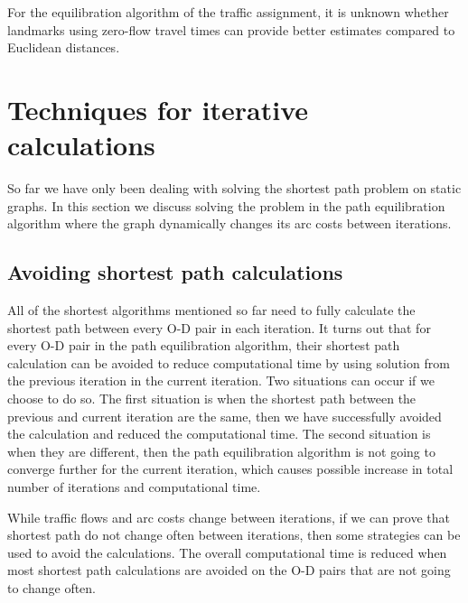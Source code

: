 For the equilibration algorithm of the traffic assignment,
it is unknown whether landmarks using zero-flow travel times can provide better estimates compared to Euclidean distances.

\section{Techniques for iterative calculations}
So far we have only been dealing with solving the shortest path problem on static graphs.
In this section we discuss solving the problem in the path equilibration algorithm where
the graph dynamically changes its arc costs between iterations.

\subsection{Avoiding shortest path calculations} \label{section:avoid}
All of the shortest algorithms mentioned so far need to fully calculate the shortest path between every O-D pair in each iteration.
It turns out that for every O-D pair in the path equilibration algorithm,
their shortest path calculation can be avoided to reduce computational time by using solution from the previous iteration in the current iteration.
Two situations can occur if we choose to do so.
The first situation is when the shortest path between the previous and current iteration are the same,
then we have successfully avoided the calculation and reduced the computational time.
The second situation is when they are different,
then the path equilibration algorithm is not going to converge further for the current iteration,
which causes possible increase in total number of iterations and computational time.

While traffic flows and arc costs change between iterations,
if we can prove that shortest path do not change often between iterations,
then some strategies can be used to avoid the calculations.
The overall computational time is reduced when most shortest path calculations are avoided on the O-D pairs that are not going to change often.

